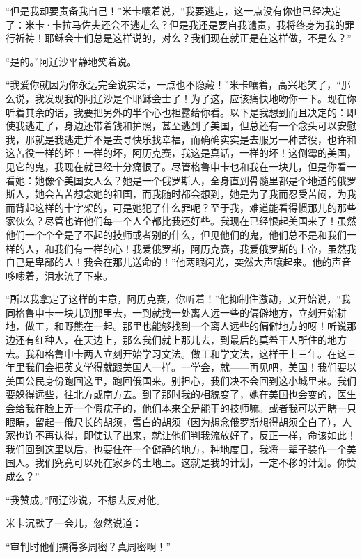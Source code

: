 \par “但是我却要责备我自己！”米卡嚷着说，“我要逃走，这一点没有你也已经决定了：米卡·卡拉马佐夫还会不逃走么？但是我还是要自我谴责，我将终身为我的罪行祈祷！耶稣会士们总是这样说的，对么？我们现在就正是在这样做，不是么？”
\par “是的。”阿辽沙平静地笑着说。
\par “我爱你就因为你永远完全说实话，一点也不隐藏！”米卡嚷着，高兴地笑了，“那么说，我发现我的阿辽沙是个耶稣会士了！为了这，应该痛快地吻你一下。现在你听着其余的话，我要把另外的半个心也袒露给你看。以下是我想到而且决定的：即使我逃走了，身边还带着钱和护照，甚至逃到了美国，但总还有一个念头可以安慰我，那就是我逃走并不是去寻快乐找幸福，而确确实实是去服另一种苦役，也许和这苦役一样的坏！一样的坏，阿历克赛，我这是真话，一样的坏！这倒霉的美国，见它的鬼，我现在就已经十分痛恨了。尽管格鲁申卡也和我在一块儿，但是你看一看她：她像个美国女人么？她是一个俄罗斯人，全身直到骨髓里都是个地道的俄罗斯人，她会苦苦想念她的祖国，而我随时都会想到，她是为了我而忍受苦闷，为我而背起这样的十字架的，可是她犯了什么罪呢？至于我，难道能看得惯那儿的那些家伙么？尽管也许他们每一个人全都比我还好些。我现在已经恨起美国来了！虽然他们一个个全是了不起的技师或者别的什么，但见他们的鬼，他们总不是和我们一样的人，和我们有一样的心！我爱俄罗斯，阿历克赛，我爱俄罗斯的上帝，虽然我自己是卑鄙的人！我会在那儿送命的！”他两眼闪光，突然大声嚷起来。他的声音哆嗦着，泪水流了下来。
\par “所以我拿定了这样的主意，阿历克赛，你听着！”他抑制住激动，又开始说，“我同格鲁申卡一块儿到那里去，一到就找一处离人远一些的偏僻地方，立刻开始耕地，做工，和野熊在一起。那里也能够找到一个离人远些的偏僻地方的呀！听说那边还有红种人，在天边上，那么我们就上那儿去，到最后的莫希干人所住的地方去。我和格鲁申卡两人立刻开始学习文法。做工和学文法，这样干上三年。在这三年里我们会把英文学得就跟美国人一样。一学会，就——再见吧，美国！我们要以美国公民身份跑回这里，跑回俄国来。别担心，我们决不会回到这小城里来。我们要躲得远些，往北方或南方去。到了那时我的相貌变了，她在美国也会变的，医生会给我在脸上弄一个假疣子的，他们本来全是能干的技师嘛。或者我可以弄瞎一只眼睛，留起一俄尺长的胡须，雪白的胡须（因为想念俄罗斯想得胡须全白了），人家也许不再认得，即使认了出来，就让他们判我流放好了，反正一样，命该如此！我们回到这里以后，也要住在一个僻静的地方，种地度日，我将一辈子装作一个美国人。我们究竟可以死在家乡的土地上。这就是我的计划，一定不移的计划。你赞成么？”
\par “我赞成。”阿辽沙说，不想去反对他。
\par 米卡沉默了一会儿，忽然说道：
\par “审判时他们搞得多周密？真周密啊！”
